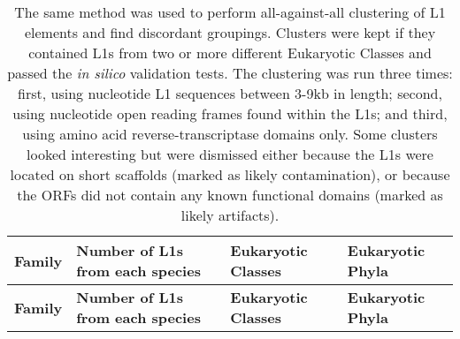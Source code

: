 {\footnotesize
	\begin{longtable}{| C{1.5cm} | L{8.4cm} | L{2.4cm} | L{2.4cm} |} 
		\caption{\footnotesize
		The same method was used to perform all-against-all clustering of L1 elements and find discordant groupings.  
		Clusters were kept if they contained L1s from two or more different Eukaryotic Classes and passed the \textit{in silico} validation tests. 
		The clustering was run three times: first, using nucleotide L1 sequences between 3-9kb in length; second, using nucleotide open reading frames found within the L1s; and third, using amino acid reverse-transcriptase domains only. 
		Some clusters looked interesting but were dismissed either because the L1s were located on short scaffolds (marked as likely contamination), or because the ORFs did not contain any known functional domains (marked as likely artifacts). \label{table:L1htfamiliesTable}} \\
		
\hline \textbf{Family} & \textbf{Number of L1s from each species} & \textbf{Eukaryotic Classes} & \textbf{Eukaryotic Phyla} \\ \hline 
\endfirsthead %

\hline \textbf{Family} & \textbf{Number of L1s from each species} & \textbf{Eukaryotic Classes} & \textbf{Eukaryotic Phyla} \\ \hline 
\endhead %
		

\end{longtable}}
